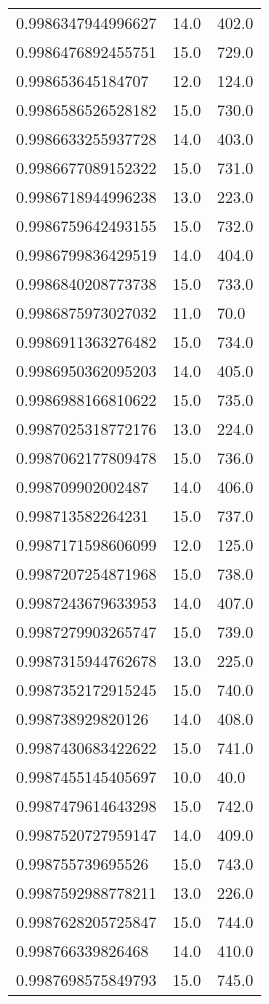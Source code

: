 \begin{center}
\begin{supertabular}[H]{p{0.30\textwidth}p{0.05\textwidth}p{0.05\textwidth}}
0.9986347944996627 & 14.0 & 402.0 \\ 
0.9986476892455751 & 15.0 & 729.0 \\ 
0.998653645184707 & 12.0 & 124.0 \\ 
0.9986586526528182 & 15.0 & 730.0 \\ 
0.9986633255937728 & 14.0 & 403.0 \\ 
0.9986677089152322 & 15.0 & 731.0 \\ 
0.9986718944996238 & 13.0 & 223.0 \\ 
0.9986759642493155 & 15.0 & 732.0 \\ 
0.9986799836429519 & 14.0 & 404.0 \\ 
0.9986840208773738 & 15.0 & 733.0 \\ 
0.9986875973027032 & 11.0 & 70.0 \\ 
0.9986911363276482 & 15.0 & 734.0 \\ 
0.9986950362095203 & 14.0 & 405.0 \\ 
0.9986988166810622 & 15.0 & 735.0 \\ 
0.9987025318772176 & 13.0 & 224.0 \\ 
0.9987062177809478 & 15.0 & 736.0 \\ 
0.998709902002487 & 14.0 & 406.0 \\ 
0.998713582264231 & 15.0 & 737.0 \\ 
0.9987171598606099 & 12.0 & 125.0 \\ 
0.9987207254871968 & 15.0 & 738.0 \\ 
0.9987243679633953 & 14.0 & 407.0 \\ 
0.9987279903265747 & 15.0 & 739.0 \\ 
0.9987315944762678 & 13.0 & 225.0 \\ 
0.9987352172915245 & 15.0 & 740.0 \\ 
0.998738929820126 & 14.0 & 408.0 \\ 
0.9987430683422622 & 15.0 & 741.0 \\ 
0.9987455145405697 & 10.0 & 40.0 \\ 
0.9987479614643298 & 15.0 & 742.0 \\ 
0.9987520727959147 & 14.0 & 409.0 \\ 
0.998755739695526 & 15.0 & 743.0 \\ 
0.9987592988778211 & 13.0 & 226.0 \\ 
0.9987628205725847 & 15.0 & 744.0 \\ 
0.998766339826468 & 14.0 & 410.0 \\ 
0.9987698575849793 & 15.0 & 745.0 \\ 

\end{supertabular}
\end{center}
